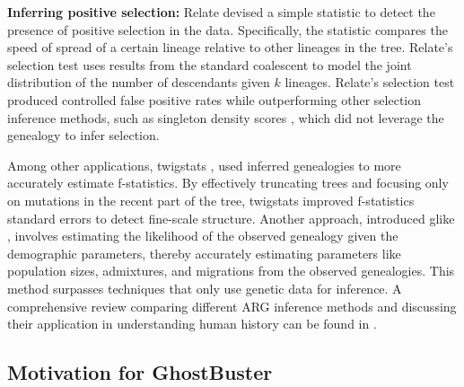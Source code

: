 \textbf{Inferring positive selection:} Relate \cite{speidel2024high} devised a simple statistic to detect the presence of positive selection in the data. Specifically, the statistic compares the speed of spread of a certain lineage relative to other lineages in the tree. Relate's selection test uses results from the standard coalescent to model the joint distribution of the number of descendants given \(k\) lineages. Relate's selection test produced controlled false positive rates while outperforming other selection inference methods, such as singleton density scores \cite{field2016detection}, which did not leverage the genealogy to infer selection.

Among other applications, twigstats \cite{speidel2024high}, used inferred genealogies to more accurately estimate f-statistics. By effectively truncating trees and focusing only on mutations in the recent part of the tree, twigstats improved f-statistics standard errors to detect fine-scale structure. Another approach, introduced glike \cite{fan2023likelihood}, involves estimating the likelihood of the observed genealogy given the demographic parameters, thereby accurately estimating parameters like population sizes, admixtures, and migrations from the observed genealogies. This method surpasses techniques that only use genetic data for inference. A comprehensive review comparing different ARG inference methods and discussing their application in understanding human history can be found in \cite{brandt2024promise}.

\subsection{Motivation for GhostBuster}



